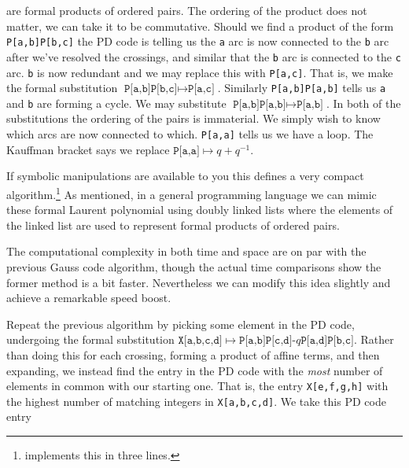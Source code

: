         are formal products of ordered pairs. The ordering of the product
        does not matter, we can take it to be commutative. Should we find a
        product of the form \texttt{P[a,b]P[b,c]} the PD code is telling us
        the \texttt{a} arc is now connected to the \texttt{b} arc after we've
        resolved the crossings, and similar that the \texttt{b} arc is
        connected to the \texttt{c} arc. \texttt{b} is now redundant and we
        may replace this with \texttt{P[a,c]}. That is, we make the formal
        substitution $\texttt{P[a,b]P[b,c]}\mapsto\texttt{P[a,c]}$. Similarly
        \texttt{P[a,b]P[a,b]} tells us \texttt{a} and \texttt{b} are forming a
        cycle. We may substitute $\texttt{P[a,b]P[a,b]}\mapsto\texttt{P[a,b]}$.
        In both of the substitutions the ordering of the pairs is immaterial.
        We simply wish to know which arcs are now connected to which.
        \texttt{P[a,a]} tells us we have a loop. The Kauffman bracket says
        we replace $\texttt{P[a,a]}\mapsto{q}+q^{-1}$.
        \par\hfill\par
        If symbolic manipulations are available to you this defines a very
        compact algorithm.\footnote{%
            \cite{KatlasJones} implements this in three lines.
        }
        As mentioned, in a general programming language we can mimic these
        formal Laurent polynomial using doubly linked lists where the elements
        of the linked list are used to represent formal products of ordered
        pairs.
        \par\hfill\par
        The computational complexity in both time and space are on par with the
        previous Gauss code algorithm, though the actual time comparisons show
        the former method is a bit faster. Nevertheless we can modify this
        idea slightly and achieve a remarkable speed boost.
        \par\hfill\par
        Repeat the previous algorithm by picking some element in the PD code,
        undergoing the formal substitution
        $\texttt{X[a,b,c,d]}\mapsto\texttt{P[a,b]P[c,d]-$q$P[a,d]P[b,c]}$.
        Rather than doing this for each crossing,
        forming a product of affine terms,
        and then expanding, we instead find the entry in the PD code with the
        \textit{most} number of elements in common with our starting one.
        That is, the entry \texttt{X[e,f,g,h]} with the highest number of
        matching integers in \texttt{X[a,b,c,d]}. We take this PD code entry
